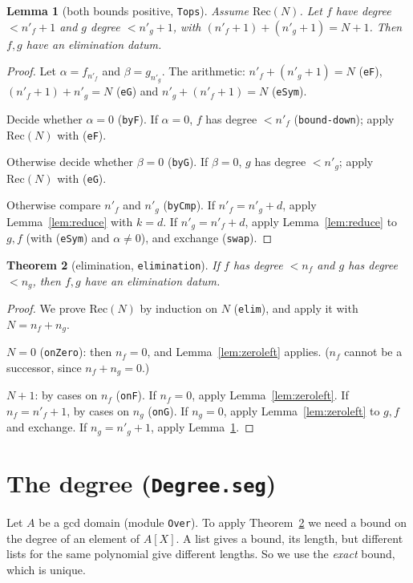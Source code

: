 \documentclass[11pt]{amsart}
\newtheorem{theorem}{Theorem}[section]
\newtheorem{lemma}[theorem]{Lemma}
\theoremstyle{definition}
\theoremstyle{remark}
\newcommand{\nm}[1]{\textup{\texttt{#1}}}
\newcommand{\file}[1]{\textup{\texttt{#1.seg}}}
\begin{document}
\begin{lemma}[both bounds positive, \nm{Tops}]\label{lem:tops}
Assume $\mathrm{Rec}(N)$. Let $f$ have degree $<n'_f+1$ and $g$ degree
$<n'_g+1$, with $(n'_f+1)+(n'_g+1) = N+1$. Then $f,g$ have an elimination
datum.
\end{lemma}
\begin{proof}
Let $\alpha = f_{n'_f}$ and $\beta = g_{n'_g}$. The arithmetic:
$n'_f + (n'_g+1) = N$ (\nm{eF}), $(n'_f+1)+n'_g = N$ (\nm{eG}) and
$n'_g + (n'_f+1) = N$ (\nm{eSym}).

Decide whether $\alpha = 0$ (\nm{byF}). If $\alpha=0$, $f$ has degree
$<n'_f$ (\nm{bound-down}); apply $\mathrm{Rec}(N)$ with (\nm{eF}).

Otherwise decide whether $\beta = 0$ (\nm{byG}). If $\beta = 0$, $g$ has
degree $<n'_g$; apply $\mathrm{Rec}(N)$ with (\nm{eG}).

Otherwise compare $n'_f$ and $n'_g$ (\nm{byCmp}). If $n'_f = n'_g + d$,
apply Lemma~\ref{lem:reduce} with $k = d$. If $n'_g = n'_f + d$, apply
Lemma~\ref{lem:reduce} to $g, f$ (with (\nm{eSym}) and $\alpha\neq0$),
and exchange (\nm{swap}).
\end{proof}

\begin{theorem}[elimination, \nm{elimination}]\label{thm:elim}
If $f$ has degree $<n_f$ and $g$ has degree $<n_g$, then $f,g$ have an
elimination datum.
\end{theorem}
\begin{proof}
We prove $\mathrm{Rec}(N)$ by induction on $N$ (\nm{elim}), and apply it
with $N = n_f+n_g$.

$N = 0$ (\nm{onZero}): then $n_f = 0$, and Lemma~\ref{lem:zeroleft}
applies. ($n_f$ cannot be a successor, since $n_f+n_g = 0$.)

$N+1$: by cases on $n_f$ (\nm{onF}). If $n_f = 0$, apply
Lemma~\ref{lem:zeroleft}. If $n_f = n'_f+1$, by cases on $n_g$
(\nm{onG}). If $n_g = 0$, apply Lemma~\ref{lem:zeroleft} to $g,f$ and
exchange. If $n_g = n'_g+1$, apply Lemma~\ref{lem:tops}.
\end{proof}

\section{The degree (\file{Degree})}

Let $A$ be a gcd domain (module \nm{Over}). To apply
Theorem~\ref{thm:elim} we need a bound on the degree of an element of
$A[X]$. A list gives a bound, its length, but different lists for the
same polynomial give different lengths. So we use the \emph{exact} bound,
which is unique.
\end{document}
